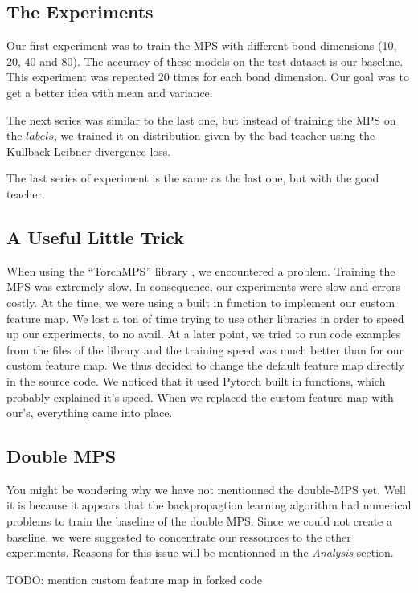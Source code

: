 \documentclass{article}
\theoremstyle{definition}
\theoremstyle{definition}
\begin{document}
\subsection{The Experiments}
Our first experiment was to train the MPS with different bond dimensions (10, 20, 40 and 80). The accuracy of these models on the test dataset is our baseline. This experiment was repeated $20$ times for each bond dimension. Our goal was to get a better idea with mean and variance.

The next series was similar to the last one, but instead of training the MPS on the $labels$, we trained it on distribution given by the bad teacher using the Kullback-Leibner divergence loss.

The last series of experiment is the same as the last one, but with the good teacher.

\subsection{A Useful Little Trick}
When using the \enquote{TorchMPS} library \cite{torchmps}, we encountered a problem. Training the MPS was extremely slow. In consequence, our experiments were slow and errors costly. At the time, we were using a built in function to implement our custom feature map. We lost a ton of time trying to use other libraries in order to speed up our experiments, to no avail. At a later point, we tried to run code examples from the files of the library and the training speed was much better than for our custom feature map. We thus decided to change the default feature map directly in the source code. We noticed that it used Pytorch built in functions, which probably explained it's speed. When we replaced the custom feature map with our's, everything came into place.


\subsection{Double MPS}
You might be wondering why we have not mentionned the double-MPS yet. Well it is because it appears that the backpropagtion learning algorithm had numerical problems to train the baseline of the double MPS. Since we could not create a baseline, we were suggested to concentrate our ressources to the other experiments. Reasons for this issue will be mentionned in the \emph{Analysis} section. 





TODO: mention custom feature map in forked code
\end{document}
